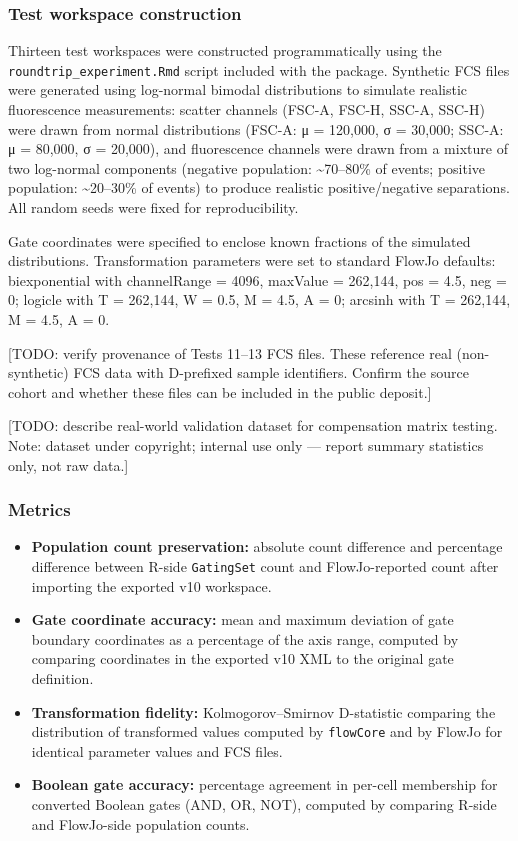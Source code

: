 \documentclass[
]{article}
\providecommand{\tightlist}{%
  \setlength{\itemsep}{0pt}\setlength{\parskip}{0pt}}
\begin{document}
\subsubsection{Test workspace
construction}\label{test-workspace-construction}

Thirteen test workspaces were constructed programmatically using the
\texttt{roundtrip\_experiment.Rmd} script included with the package.
Synthetic FCS files were generated using log-normal bimodal
distributions to simulate realistic fluorescence measurements: scatter
channels (FSC-A, FSC-H, SSC-A, SSC-H) were drawn from normal
distributions (FSC-A: μ = 120,000, σ = 30,000; SSC-A: μ = 80,000, σ =
20,000), and fluorescence channels were drawn from a mixture of two
log-normal components (negative population: \textasciitilde70--80\% of
events; positive population: \textasciitilde20--30\% of events) to
produce realistic positive/negative separations. All random seeds were
fixed for reproducibility.

Gate coordinates were specified to enclose known fractions of the
simulated distributions. Transformation parameters were set to standard
FlowJo defaults: biexponential with channelRange = 4096, maxValue =
262,144, pos = 4.5, neg = 0; logicle with T = 262,144, W = 0.5, M = 4.5,
A = 0; arcsinh with T = 262,144, M = 4.5, A = 0.

\textcolor{pending}{[TODO: verify provenance of Tests 11–13 FCS files. These reference real (non-synthetic) FCS data with D-prefixed sample identifiers. Confirm the source cohort and whether these files can be included in the public deposit.]}

\textcolor{pending}{[TODO: describe real-world validation dataset for compensation matrix testing. Note: dataset under copyright; internal use only — report summary statistics only, not raw data.]}

\subsubsection{Metrics}\label{metrics}

\begin{itemize}
\tightlist
\item
  \textbf{Population count preservation:} absolute count difference and
  percentage difference between R-side \texttt{GatingSet} count and
  FlowJo-reported count after importing the exported v10 workspace.
\item
  \textbf{Gate coordinate accuracy:} mean and maximum deviation of gate
  boundary coordinates as a percentage of the axis range, computed by
  comparing coordinates in the exported v10 XML to the original gate
  definition.
\item
  \textbf{Transformation fidelity:} Kolmogorov--Smirnov D-statistic
  comparing the distribution of transformed values computed by
  \texttt{flowCore} and by FlowJo for identical parameter values and FCS
  files.
\item
  \textbf{Boolean gate accuracy:} percentage agreement in per-cell
  membership for converted Boolean gates (AND, OR, NOT), computed by
  comparing R-side and FlowJo-side population counts.
\end{itemize}
\end{document}
